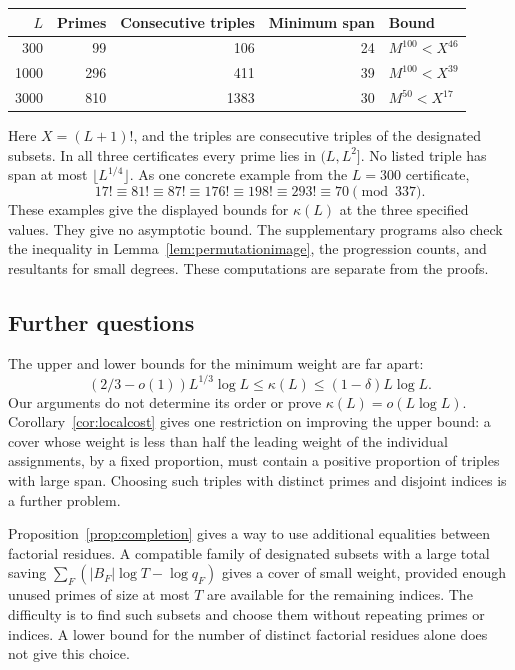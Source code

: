 \documentclass[11pt]{amsart}
\theoremstyle{definition}
\theoremstyle{remark}
\begin{document}
\begin{center}
\small
\begin{tabular}{rrrrl}
\toprule
$L$ & Primes & Consecutive triples & Minimum span & Bound\\
\midrule
300 & 99 & 106 & 24 & $M^{100}<X^{46}$\\
1000 & 296 & 411 & 39 & $M^{100}<X^{39}$\\
3000 & 810 & 1383 & 30 & $M^{50}<X^{17}$\\
\bottomrule
\end{tabular}
\end{center}
Here $X=(L+1)!$, and the triples are consecutive triples of the designated
subsets. In all three certificates every prime lies in $(L,L^2]$.
No listed triple has span at most $\lfloor L^{1/4}\rfloor$.
As one concrete example from the $L=300$ certificate,
\[
17!\equiv81!\equiv87!\equiv176!\equiv198!\equiv293!
\equiv70\pmod{337}.
\]
These examples give the displayed bounds for $\kappa(L)$ at the three
specified values. They give no asymptotic bound. The supplementary
programs also check the inequality in Lemma~\ref{lem:permutationimage},
the progression counts, and resultants for small degrees. These
computations are separate from the proofs.

\subsection{Further questions}
The upper and lower bounds for the minimum weight are far apart:
\[
(2/3-o(1))L^{1/3}\log L
\leq\kappa(L)\leq(1-\delta)L\log L.
\]
Our arguments do not determine its order or prove
$\kappa(L)=o(L\log L)$. Corollary~\ref{cor:localcost} gives one
restriction on improving the upper bound: a cover whose weight is less
than half the leading weight of the individual assignments, by a fixed
proportion, must contain a positive proportion of triples with large
span. Choosing such triples with distinct primes and disjoint indices
is a further problem.

Proposition~\ref{prop:completion} gives a way to use additional equalities
between factorial residues. A compatible family of designated subsets
with a large total saving $\sum_F(|B_F|\log T-\log q_F)$ gives a cover
of small weight, provided enough unused primes of size at most $T$ are
available for the remaining indices. The difficulty is to find such
subsets and choose them without repeating primes or indices. A lower
bound for the number of distinct factorial residues alone does not give
this choice.
\end{document}

